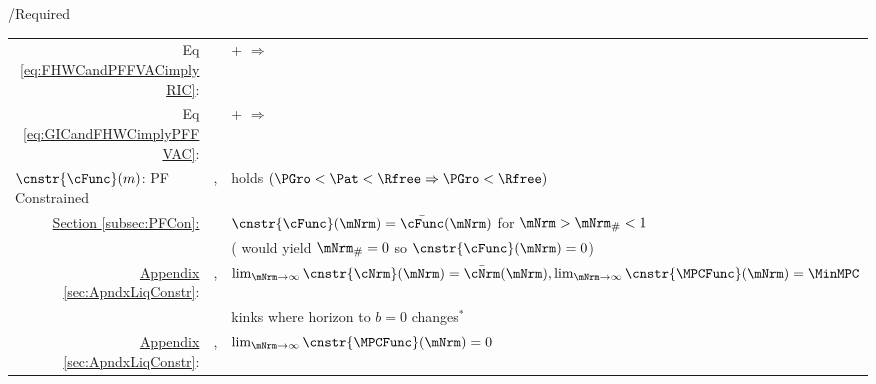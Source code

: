 \documentclass[\econtexRoot/BufferStockTheory]{subfiles}
\begin{document}
\begin{verbatimwrite}{\TableDir/Required}
\begin{table}
{\begin{tabular}{|l|l|l|}
    \\ \multicolumn{1}{|r|}{Eq \eqref{eq:FHWCandPFFVACimplyRIC}:}                                                                              &                                         & {\PFFVAC}+{\FHWC} $\Rightarrow$ {\RIC}         
    \\ \multicolumn{1}{|r|}{{Eq \eqref{eq:GICandFHWCimplyPFFVAC}}:}                                                                              &                                         & {\GIC}+{\FHWC} $\Rightarrow$ {\PFFVAC}         
    \\ \hline\hline \multicolumn{1}{|l|}{$\cnstr{\cFunc}(m)$: PF Constrained}                                              & \cncl{\GICRaw}, \RIC                    & {\FHWC} holds $(\PGro < \Pat < \Rfree \Rightarrow \PGro < \Rfree)$
    \\
\multicolumn{1}{|r|}{\href{https://\owner.github.io/BufferStockTheory\#PF-Constrained-Solution}{Section \ref{subsec:PFCon}:}}                &                                         & $\cnstr{\cFunc}(\mNrm)=\bar{\cFunc}(\mNrm)$ for $\mNrm > \mNrm_{\#} < 1$
    \\                                                                                                                        &                                         & (\cncl{\RIC} would yield $\mNrm_{\#}=0$ so $\cnstr{\cFunc}(\mNrm)=0$)
    \\ \cline{2-3}  \multicolumn{1}{|r|}{\href{https://\owner.github.io/BufferStockTheory\#ApndxLiqConstr}{Appendix \ref{sec:ApndxLiqConstr}}:} & \GICRaw,\RIC                            & $\lim_{\mNrm \rightarrow \infty} \cnstr{\cNrm}(\mNrm)=\bar{\cNrm}(\mNrm), \lim_{\mNrm \rightarrow \infty} \cnstr{\MPCFunc}(\mNrm)=\MinMPC$                                                                                                                                                                       
    \\                                                                                                                        &                                         & kinks where horizon to $b=0$ changes$^{\ast}$
    \\ \cline{2-3}\multicolumn{1}{|r|}{\href{https://\owner.github.io/BufferStockTheory\#ApndxLiqConstr}{Appendix \ref{sec:ApndxLiqConstr}}:}  & \GICRaw,\cncl{\RIC}                     & $\lim_{\mNrm \rightarrow \infty}  \cnstr{\MPCFunc}(\mNrm)=0$

\end{tabular}}
\end{table}
\end{verbatimwrite}
\end{document}
